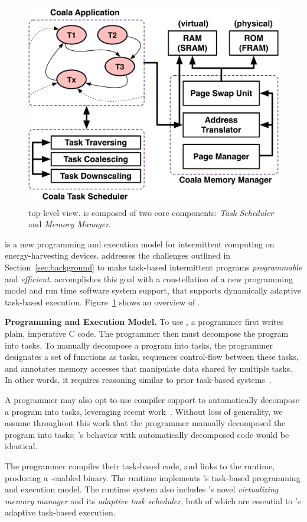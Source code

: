 \begin{figure}
	\centering
	\includegraphics[width=0.45\columnwidth]{figures/graffle/overview.pdf}
	\caption{\sys top-level view. \sys is composed of two core components: \emph{Task Scheduler} and \emph{Memory Manager}.}
	\label{fig:system_overview}
\end{figure}

\sys is a new programming and execution model for intermittent computing on energy-harvesting devices. \sys addresses the challenges outlined in Section~\ref{sec:background} to make task-based intermittent programs {\em programmable} and {\em efficient}. \sys accomplishes this goal with a constellation of a new programming model and run time software system support, that supports dynamically adaptive task-based execution. Figure~\ref{fig:system_overview} shows an overview of \sys.

\textbf{\sys Programming and Execution Model.}  To use \sys, a programmer first writes plain, imperative C code. The programmer then must decompose the program into tasks. To manually decompose a program into tasks, the programmer designates a set of functions as tasks, sequences control-flow between these tasks, and annotates memory accesses that manipulate data shared by multiple tasks. In other words, it requires reasoning similar to prior task-based systems~\cite{chain,alpaca}. 

A programmer may also opt to use compiler support to automatically decompose a program into tasks, leveraging recent work~\cite{cleancut_2018,baghsorkhi_cgo_2018}. Without loss of generality, we assume throughout this work that the programmer manually decomposed the program into tasks; \sys's behavior with automatically decomposed code would be identical.

The programmer compiles their task-based code, and links to the \sys runtime,
producing a \sys-enabled binary. The \sys runtime implements \sys's task-based
programming and execution model. The runtime system also includes \sys's novel
{\em virtualizing memory manager} and its {\em adaptive task scheduler}, both
of which are essential to \sys's adaptive task-based execution.

